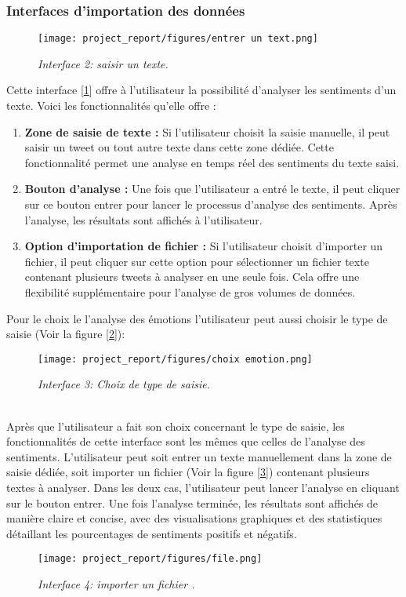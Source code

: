 \subsubsection{Interfaces d'importation des données}
\begin{figure}[h]
    \centering
    \texttt{[image: project\_report/figures/entrer un text.png]}
    \caption{\textit{Interface 2: saisir un texte.}}
    \label{fig:text}
\end{figure}
Cette interface [\ref{fig:text}] offre à l'utilisateur la possibilité d'analyser les sentiments d'un texte. Voici les fonctionnalités qu'elle offre :
\begin{enumerate}
    \item \textbf{Zone de saisie de texte : }Si l'utilisateur choisit la saisie manuelle, il peut saisir un tweet ou tout autre texte dans cette zone dédiée. Cette fonctionnalité permet une analyse en temps réel des sentiments du texte saisi.
    \item \textbf{Bouton d'analyse :} Une fois que l'utilisateur a entré le texte, il peut cliquer sur ce bouton entrer pour lancer le processus d'analyse des sentiments. Après l'analyse, les résultats sont affichés à l'utilisateur.
    \item \textbf{Option d'importation de fichier :} Si l'utilisateur choisit d'importer un fichier, il peut cliquer sur cette option pour sélectionner un fichier texte contenant plusieurs tweets à analyser en une seule fois. Cela offre une flexibilité supplémentaire pour l'analyse de gros volumes de données.
\end{enumerate}
Pour le choix le l'analyse des émotions l'utilisateur peut aussi choisir le type de saisie (Voir la figure [\ref{fig:tem}]): 
\begin{figure}[h]
    \centering
    \texttt{[image: project\_report/figures/choix emotion.png]}
    \caption{\textit{Interface 3: Choix de type de saisie.}}
    \label{fig:tem}
\end{figure}\\
Après que l'utilisateur a fait son choix concernant le type de saisie, les fonctionnalités de cette interface sont les mêmes que celles de l'analyse des sentiments. L'utilisateur peut soit entrer un texte manuellement dans la zone de saisie dédiée, soit importer un fichier (Voir la figure [\ref{fig:fechtt}]) contenant plusieurs textes à analyser. Dans les deux cas, l'utilisateur peut lancer l'analyse en cliquant sur le bouton entrer. Une fois l'analyse terminée, les résultats sont affichés de manière claire et concise, avec des visualisations graphiques et des statistiques détaillant les pourcentages de sentiments positifs et négatifs.
\begin{figure}[h]
    \centering
    \texttt{[image: project\_report/figures/file.png]}
    \caption{\textit{Interface 4: importer un fichier .}}
    \label{fig:fechtt}
\end{figure}
